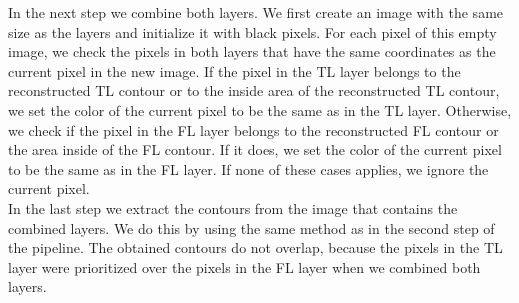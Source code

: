 \documentclass[thesis.tex]{subfiles}
\begin{document}
In the next step we combine both layers. We first create an image with the same size as the layers and initialize it with black pixels. For each pixel of this empty image, we check the pixels in both layers that have the same coordinates as the current pixel in the new image. If the pixel in the TL layer belongs to the reconstructed TL contour or to the inside area of the reconstructed TL contour, we set the color of the current pixel to be the same as in the TL layer. Otherwise, we check if the pixel in the FL layer belongs to the reconstructed FL contour or the area inside of the FL contour. If it does, we set the color of the current pixel to be the same as in the FL layer. If none of these cases applies, we ignore the current pixel.\\
In the last step we extract the contours from the image that contains the combined layers. We do this by using the same method as in the second step of the pipeline. The obtained contours do not overlap, because the pixels in the TL layer were prioritized over the pixels in the FL layer when we combined both layers.        



\subfilebib %
\end{document}
